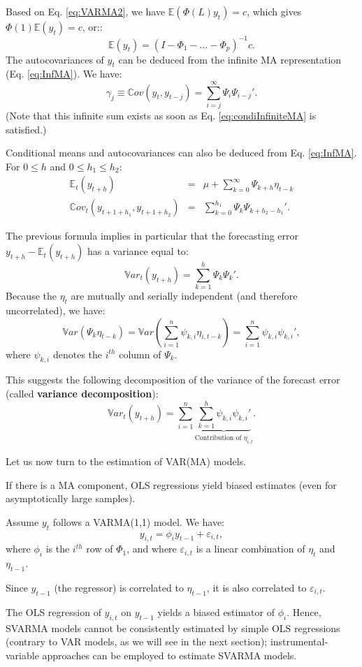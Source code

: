 \documentclass[
  12pt,
]{book}
\theoremstyle{definition}
\theoremstyle{definition}
\theoremstyle{definition}
\theoremstyle{definition}
\theoremstyle{remark}
\begin{document}
Based on Eq. \eqref{eq:VARMA2}, we have \(\mathbb{E}(\Phi(L)y_t)=c\), which gives \(\Phi(1)\mathbb{E}(y_t)=c\), or::
\[
\mathbb{E}(y_t) = (I - \Phi_1 - \dots - \Phi_p)^{-1}c.
\]
The autocovariances of \(y_t\) can be deduced from the infinite MA representation (Eq. \eqref{eq:InfMA}). We have:
\[
\gamma_j \equiv \mathbb{C}ov(y_t,y_{t-j}) = \sum_{i=j}^\infty \Psi_i \Psi_{i-j}'.
\]
(Note that this infinite sum exists as soon as Eq. \eqref{eq:condiInfiniteMA} is satisfied.)

Conditional means and autocovariances can also be deduced from Eq. \eqref{eq:InfMA}. For \(0 \le h\) and \(0 \le h_1 \le h_2\):
\begin{eqnarray*}
\mathbb{E}_t(y_{t+h}) &=& \mu + \sum_{k=0}^\infty \Psi_{k+h} \eta_{t-k} \\
\mathbb{C}ov_t(y_{t+1+h_1},y_{t+1+h_2}) &=& \sum_{k=0}^{h_1} \Psi_{k}\Psi_{k+h_2-h_1}'.
\end{eqnarray*}

The previous formula implies in particular that the forecasting error \(y_{t+h} - \mathbb{E}_t(y_{t+h})\) has a variance equal to:
\[
\mathbb{V}ar_t(y_{t+h}) = \sum_{k=1}^{h} \Psi_{k}\Psi_{k}'.
\]
Because the \(\eta_t\) are mutually and serially independent (and therefore uncorrelated), we have:
\[
\mathbb{V}ar(\Psi_k \eta_{t-k}) = \mathbb{V}ar\left(\sum_{i=1}^n \psi_{k,i} \eta_{i,t-k}\right)  = \sum_{i=1}^n \psi_{k,i}\psi_{k,i}',
\]
where \(\psi_{k,i}\) denotes the \(i^{th}\) column of \(\Psi_k\).

This suggests the following decomposition of the variance of the forecast error (called \textbf{variance decomposition}):
\[
\mathbb{V}ar_t(y_{t+h}) = \sum_{i=1}^n \underbrace{\sum_{k=1}^{h}  \psi_{k,i}\psi_{k,i}'}_{\mbox{Contribution of $\eta_{i,t}$}}.
\]

Let us now turn to the estimation of VAR(MA) models.

If there is a MA component, OLS regressions yield biased estimates (even for asymptotically large samples).

Assume \(y_t\) follows a VARMA(1,1) model. We have:
\[
y_{i,t} = \phi_i y_{t-1} + \varepsilon_{i,t},
\]
where \(\phi_i\) is the \(i^{th}\) row of \(\Phi_1\), and where \(\varepsilon_{i,t}\) is a linear combination of \(\eta_t\) and \(\eta_{t-1}\).

Since \(y_{t-1}\) (the regressor) is correlated to \(\eta_{t-1}\), it is also correlated to \(\varepsilon_{i,t}\).

The OLS regression of \(y_{i,t}\) on \(y_{t-1}\) yields a biased estimator of \(\phi_i\). Hence, SVARMA models cannot be consistently estimated by simple OLS regressions (contrary to VAR models, as we will see in the next section); instrumental-variable approaches can be employed to estimate SVARMA models.
\end{document}
